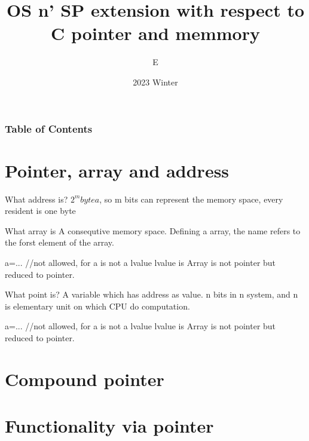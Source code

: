 \documentclass{beamer}
\title{OS n' SP extension with respect to C pointer and memmory}
\author{E}
\institute{University of Birmingham}
\date{2023 Winter}
\begin{document}
\frame{\titlepage}

\begin{frame}
    \frametitle{Table of Contents}
    \tableofcontents
\end{frame}


\section{Pointer, array and address}
\begin{frame}{What address is?}
  $2^m bytea$, so m bits can represent the memory space, every resident is one byte
\end{frame}

\begin{frame}{What array is}
  A consequtive memory space.
  Defining a array, the name refers to the forst element of the array.

  a=... //not allowed, for a is not a lvalue
  lvalue is 
  Array is not pointer but reduced to pointer.

\end{frame}

\begin{frame}{What point is?}
A variable which has address as value. n bits in n system, and n is elementary unit on which CPU do computation.
\end{frame}

\begin{frame}

a=... //not allowed, for a is not a lvalue
  lvalue is 
  Array is not pointer but reduced to pointer.
  
\end{frame}


\section{Compound pointer}

\section{Functionality via pointer}
\end{document}
